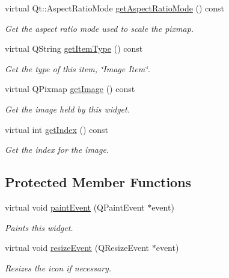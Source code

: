 \begin{DoxyCompactItemize}
virtual Qt\-::\-Aspect\-Ratio\-Mode \hyperlink{class_u_i_1_1_image_item_widget_a8564af5f441d167c5d4598bb0c724f2d}{get\-Aspect\-Ratio\-Mode} () const 
\begin{DoxyCompactList}\small\item\em Get the aspect ratio mode used to scale the pixmap. \end{DoxyCompactList}\item 
virtual Q\-String \hyperlink{class_u_i_1_1_image_item_widget_adb9ec12755a76c89bb8342947810f9c0}{get\-Item\-Type} () const 
\begin{DoxyCompactList}\small\item\em Get the type of this item, \char`\"{}\-Image Item\char`\"{}. \end{DoxyCompactList}\item 
virtual Q\-Pixmap \hyperlink{class_u_i_1_1_image_item_widget_a4e21bfd0dae4754a41bf385403e903fa}{get\-Image} () const 
\begin{DoxyCompactList}\small\item\em Get the image held by this widget. \end{DoxyCompactList}\item 
virtual int \hyperlink{class_u_i_1_1_image_item_widget_acba67041bdd86a4353f128469c7fe3a1}{get\-Index} () const 
\begin{DoxyCompactList}\small\item\em Get the index for the image. \end{DoxyCompactList}\end{DoxyCompactItemize}
\subsection*{Protected Member Functions}
\begin{DoxyCompactItemize}
\item 
virtual void \hyperlink{class_u_i_1_1_image_item_widget_ad7953fb14478bc7516ce881a844da25e}{paint\-Event} (Q\-Paint\-Event $\ast$event)
\begin{DoxyCompactList}\small\item\em Paints this widget. \end{DoxyCompactList}\item 
virtual void \hyperlink{class_u_i_1_1_image_item_widget_a9b8a59d8c2c72035b3a3847b27638f21}{resize\-Event} (Q\-Resize\-Event $\ast$event)
\begin{DoxyCompactList}\small\item\em Resizes the icon if necessary. \end{DoxyCompactList}\end{DoxyCompactItemize}
